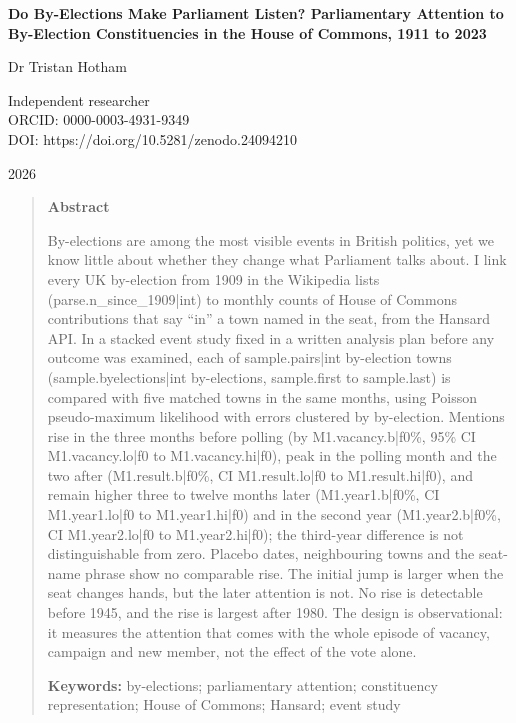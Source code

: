 \documentclass[11pt,a4paper]{article}
\begin{document}
\begin{center}
{\Large\bfseries Do By-Elections Make Parliament Listen? Parliamentary Attention to By-Election Constituencies in the House of Commons, 1911 to 2023\par}
\vspace{1.2em}
{\large Dr Tristan Hotham\par}
\vspace{0.3em}
{\small Independent researcher\\
ORCID: 0000-0003-4931-9349\\
DOI: https://doi.org/10.5281/zenodo.24094210\par}
\vspace{0.8em}
2026
\end{center}

\begin{quote}
\small
\begin{center}\textbf{Abstract}\end{center}
By-elections are among the most visible events in British politics, yet we know little about whether they change what Parliament talks about. I link every UK by-election from 1909 in the Wikipedia lists ({{parse.n_since_1909|int}}) to monthly counts of House of Commons contributions that say ``in'' a town named in the seat, from the Hansard API. In a stacked event study fixed in a written analysis plan before any outcome was examined, each of {{sample.pairs|int}} by-election towns ({{sample.byelections|int}} by-elections, {{sample.first}} to {{sample.last}}) is compared with five matched towns in the same months, using Poisson pseudo-maximum likelihood with errors clustered by by-election. Mentions rise in the three months before polling (by {{M1.vacancy.b|f0}}\%, 95\% CI {{M1.vacancy.lo|f0}} to {{M1.vacancy.hi|f0}}), peak in the polling month and the two after ({{M1.result.b|f0}}\%, CI {{M1.result.lo|f0}} to {{M1.result.hi|f0}}), and remain higher three to twelve months later ({{M1.year1.b|f0}}\%, CI {{M1.year1.lo|f0}} to {{M1.year1.hi|f0}}) and in the second year ({{M1.year2.b|f0}}\%, CI {{M1.year2.lo|f0}} to {{M1.year2.hi|f0}}); the third-year difference is not distinguishable from zero. Placebo dates, neighbouring towns and the seat-name phrase show no comparable rise. The initial jump is larger when the seat changes hands, but the later attention is not. No rise is detectable before 1945, and the rise is largest after 1980. The design is observational: it measures the attention that comes with the whole episode of vacancy, campaign and new member, not the effect of the vote alone.

\textbf{Keywords:} by-elections; parliamentary attention; constituency representation; House of Commons; Hansard; event study
\end{quote}
\end{document}
